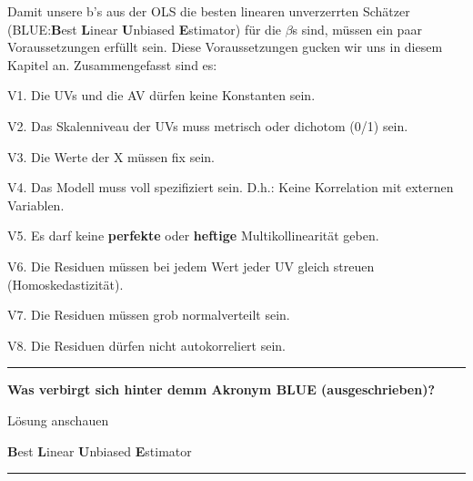 \documentclass[
  10pt,
  letterpaper,
  a4paper, twoside]{scrreprt}
\begin{document}
Damit unsere b's aus der OLS die besten linearen unverzerrten Schätzer
(BLUE:\textbf{B}est \textbf{L}inear \textbf{U}nbiased
\textbf{E}stimator) für die \(\beta\)s sind, müssen ein paar
Voraussetzungen erfüllt sein. Diese Voraussetzungen gucken wir uns in
diesem Kapitel an. Zusammengefasst sind es:

V1. Die UVs und die AV dürfen keine Konstanten sein.

V2. Das Skalenniveau der UVs muss metrisch oder dichotom (0/1) sein.

V3. Die Werte der X müssen fix sein.

V4. Das Modell muss voll spezifiziert sein. D.h.: Keine Korrelation mit
externen Variablen.

V5. Es darf keine \textbf{perfekte} oder \textbf{heftige}
Multikollinearität geben.

V6. Die Residuen müssen bei jedem Wert jeder UV gleich streuen
(Homoskedastizität).

V7. Die Residuen müssen grob normalverteilt sein.

V8. Die Residuen dürfen nicht autokorreliert sein.

\begin{center}\rule{0.5\linewidth}{0.5pt}\end{center}

\textbf{Was verbirgt sich hinter demm Akronym BLUE (ausgeschrieben)?}

Lösung anschauen

\textbf{B}est \textbf{L}inear \textbf{U}nbiased \textbf{E}stimator

\begin{center}\rule{0.5\linewidth}{0.5pt}\end{center}
\end{document}
